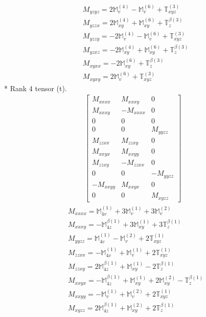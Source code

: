 \documentclass[fleqn,8pt,landscape]{jsarticle}
\begin{document}
\begin{align*}
& M_{yzyz} = 2 \mathbb{M}_{v}^{(4)} - \mathbb{M}_{v}^{(6)} + \mathbb{T}_{xyz}^{(3)} \\
& M_{yzzx} = 2 \mathbb{M}_{xy}^{(4)} + \mathbb{M}_{xy}^{(6)} + \mathbb{T}_{z}^{\beta(3)} \\
& M_{yzzy} = - 2 \mathbb{M}_{v}^{(4)} - \mathbb{M}_{v}^{(6)} + \mathbb{T}_{xyz}^{(3)} \\
& M_{yzxz} = - 2 \mathbb{M}_{xy}^{(4)} + \mathbb{M}_{xy}^{(6)} + \mathbb{T}_{z}^{\beta(3)} \\
& M_{xyxx} = - 2 \mathbb{M}_{xy}^{(6)} + \mathbb{T}_{z}^{\beta(3)} \\
& M_{xyxy} = 2 \mathbb{M}_{v}^{(6)} + \mathbb{T}_{xyz}^{(3)}
\end{align*}
* Rank 4 tensor (t).
\begin{align*}
\begin{bmatrix} M_{xxxx} & M_{xxxy} & 0 \\ M_{xxxy} & - M_{xxxx} & 0 \\ 0 & 0 & 0 \\ 0 & 0 & M_{yyzz} \\ M_{zzxx} & M_{zzxy} & 0 \\ M_{xxyx} & M_{xxyy} & 0 \\ M_{zzxy} & - M_{zzxx} & 0 \\ 0 & 0 & - M_{yyzz} \\ - M_{xxyy} & M_{xxyx} & 0 \\ 0 & 0 & M_{xyzz} \end{bmatrix}
\end{align*}
\begin{align*}
& M_{xxxx} = \mathbb{M}_{4v}^{(1)} + 3 \mathbb{M}_{v}^{(1)} + 3 \mathbb{M}_{v}^{(2)} \\
& M_{xxxy} = - \mathbb{M}_{4z}^{\beta(1)} + 3 \mathbb{M}_{xy}^{(1)} + 3 \mathbb{T}_{z}^{\beta(1)} \\
& M_{yyzz} = \mathbb{M}_{4v}^{(1)} - \mathbb{M}_{v}^{(2)} + 2 \mathbb{T}_{xyz}^{(1)} \\
& M_{zzxx} = - \mathbb{M}_{4v}^{(1)} + \mathbb{M}_{v}^{(1)} + 2 \mathbb{T}_{xyz}^{(1)} \\
& M_{zzxy} = 2 \mathbb{M}_{4z}^{\beta(1)} + \mathbb{M}_{xy}^{(1)} - 2 \mathbb{T}_{z}^{\beta(1)} \\
& M_{xxyx} = - \mathbb{M}_{4z}^{\beta(1)} + \mathbb{M}_{xy}^{(1)} + 2 \mathbb{M}_{xy}^{(2)} - \mathbb{T}_{z}^{\beta(1)} \\
& M_{xxyy} = - \mathbb{M}_{v}^{(1)} + \mathbb{M}_{v}^{(2)} + 2 \mathbb{T}_{xyz}^{(1)} \\
& M_{xyzz} = 2 \mathbb{M}_{4z}^{\beta(1)} + \mathbb{M}_{xy}^{(2)} + 2 \mathbb{T}_{z}^{\beta(1)}
\end{align*}
\end{document}
